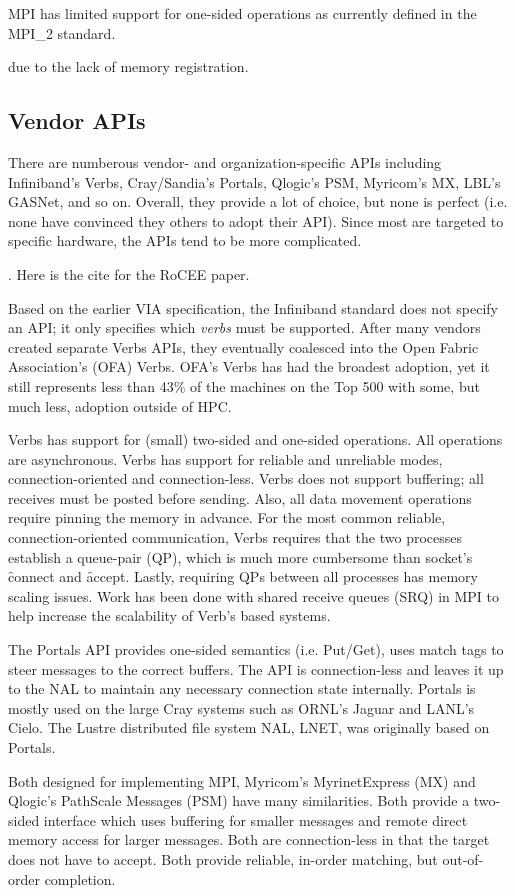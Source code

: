 MPI has limited support for one-sided operations as currently defined
in the MPI\_2 standard\cite{geist96:_mpi2_lyon}. 

due to the lack of
memory registration.

\subsection{Vendor APIs} There are numberous vendor- and organization-specific APIs
including Infiniband's Verbs\cite{ofa-verbs}, Cray/Sandia's Portals\cite{portals}, Qlogic's
PSM\cite{psm}, Myricom's MX\cite{mx}, LBL's GASNet\cite{gasnet}, and so on.  Overall, they
provide a lot of choice, but none is perfect (i.e. none have convinced they others to
adopt their API).  Since most are targeted to specific hardware, the APIs tend to be more
complicated.

.
Here is the cite for the RoCEE paper\cite{RoCEE}.

Based on the earlier VIA specification\cite{via}, the Infiniband standard does not specify
an API; it only specifies which \emph{verbs} must be supported. After many vendors created
separate Verbs APIs, they eventually coalesced into the Open Fabric Association's (OFA)
Verbs. OFA's Verbs has had the broadest adoption, yet it still represents less than 43\%
of the machines on the Top 500\cite{top500} with some, but much less, adoption outside of
HPC.

Verbs has support for (small) two-sided and one-sided operations. All operations are
asynchronous. Verbs has support for reliable and unreliable modes, connection-oriented
and connection-less. Verbs does not support buffering; all receives must be posted before
sending. Also, all data movement operations require pinning the memory in advance. For the
most common reliable, connection-oriented communication, Verbs requires that the two
processes establish a queue-pair (QP), which is much more cumbersome than socket's
\f{connect} and \f{accept}. Lastly, requiring QPs between all processes has memory scaling
issues. Work has been done with shared receive queues (SRQ) in MPI\cite{srq} to help
increase the scalability of Verb's based systems.

The Portals API provides one-sided semantics (i.e.  Put/Get), uses match tags to steer
messages to the correct buffers. The API is connection-less and leaves it up to the NAL to
maintain any necessary connection state internally. Portals is mostly used on the large
Cray systems such as ORNL's Jaguar\cite{jaguar_cug_2010} and LANL's Cielo\cite{cielo}.  The
Lustre distributed file system NAL, LNET, was originally based on Portals\cite{lnet}.

Both designed for implementing MPI, Myricom's MyrinetExpress (MX) and Qlogic's PathScale
Messages (PSM) have many similarities. Both provide a two-sided interface which uses
buffering for smaller messages and remote direct memory access for larger messages.  Both
are connection-less in that the target does not have to accept.  Both provide reliable,
in-order matching, but out-of-order completion.


